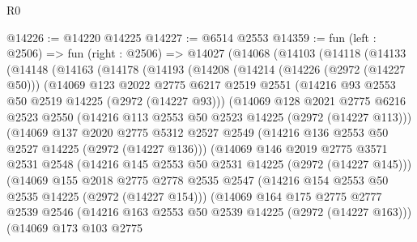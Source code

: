 \begin{lexlean}{R0}
\begin{coremodule}
@14226 := @14220 @14225
@14227 := @6514 @2553
@14359 := fun (left : @2506) =>
  fun (right : @2506) =>
  @14027
    (@14068
      (@14103
        (@14118
          (@14133
            (@14148
              (@14163
                (@14178
                  (@14193
                    (@14208
                      (@14214
                        (@14226 (@2972 (@14227 @50)))
                        (@14069
                          @123
                          @2022
                          @2775
                          @6217
                          @2519
                          @2551
                          (@14216 @93 @2553 @50 @2519 @14225 (@2972 (@14227 @93)))
                          (@14069
                            @128
                            @2021
                            @2775
                            @6216
                            @2523
                            @2550
                            (@14216 @113 @2553 @50 @2523 @14225 (@2972 (@14227 @113)))
                            (@14069
                              @137
                              @2020
                              @2775
                              @5312
                              @2527
                              @2549
                              (@14216 @136 @2553 @50 @2527 @14225 (@2972 (@14227 @136)))
                              (@14069
                                @146
                                @2019
                                @2775
                                @3571
                                @2531
                                @2548
                                (@14216 @145 @2553 @50 @2531 @14225 (@2972 (@14227 @145)))
                                (@14069
                                  @155
                                  @2018
                                  @2775
                                  @2778
                                  @2535
                                  @2547
                                  (@14216 @154 @2553 @50 @2535 @14225 (@2972 (@14227 @154)))
                                  (@14069
                                    @164
                                    @175
                                    @2775
                                    @2777
                                    @2539
                                    @2546
                                    (@14216 @163 @2553 @50 @2539 @14225 (@2972 (@14227 @163)))
                                    (@14069
                                      @173
                                      @103
                                      @2775

\end{coremodule}
\end{lexlean}
